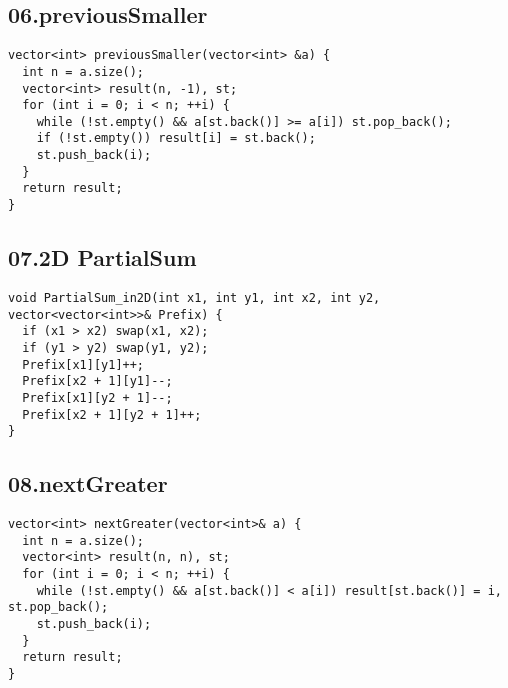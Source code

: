 \documentclass[twoside]{article}
\begin{document}
\begin{multicols*}{2}
{
\subsection*{06.previousSmaller}
}
\begin{verbatim}
vector<int> previousSmaller(vector<int> &a) {
  int n = a.size();
  vector<int> result(n, -1), st;
  for (int i = 0; i < n; ++i) {
    while (!st.empty() && a[st.back()] >= a[i]) st.pop_back();
    if (!st.empty()) result[i] = st.back();
    st.push_back(i);
  }
  return result;
}
\end{verbatim}

{
\subsection*{07.2D PartialSum}
}
\begin{verbatim}
void PartialSum_in2D(int x1, int y1, int x2, int y2, vector<vector<int>>& Prefix) {
  if (x1 > x2) swap(x1, x2);
  if (y1 > y2) swap(y1, y2);
  Prefix[x1][y1]++;
  Prefix[x2 + 1][y1]--;
  Prefix[x1][y2 + 1]--;
  Prefix[x2 + 1][y2 + 1]++;
}
\end{verbatim}

{
\subsection*{08.nextGreater}
}
\begin{verbatim}
vector<int> nextGreater(vector<int>& a) {
  int n = a.size();
  vector<int> result(n, n), st;
  for (int i = 0; i < n; ++i) {
    while (!st.empty() && a[st.back()] < a[i]) result[st.back()] = i, st.pop_back();
    st.push_back(i);
  }
  return result;
}
\end{verbatim}


\end{multicols*}
\end{document}
